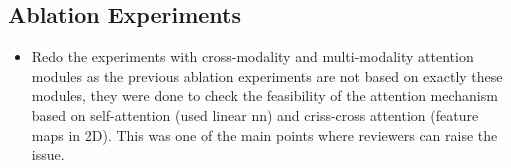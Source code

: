 \documentclass[10pt,twocolumn,letterpaper]{article}
\begin{document}
\subsection{Ablation Experiments}
\begin{itemize}
    \item Redo the experiments with cross-modality and multi-modality attention modules as the previous ablation experiments are not based on exactly these modules, they were done to check the feasibility of the attention mechanism based on self-attention (used linear nn) and criss-cross attention (feature maps in 2D).  This was one of the main points where reviewers can raise the issue.
    \end{itemize}



{\small \newpage \newpage


}
\end{document}
